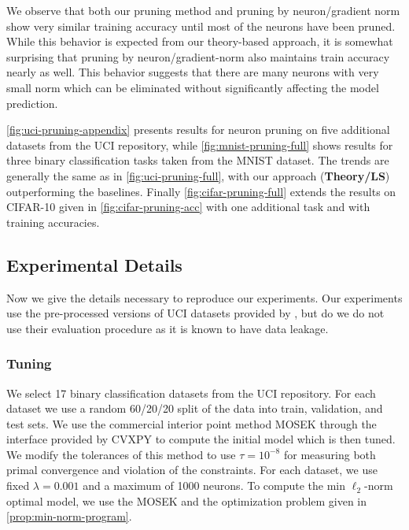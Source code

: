 We observe that both our pruning method and pruning by neuron/gradient norm
show very similar training accuracy until most of the neurons have been pruned.
While this behavior is expected from our theory-based approach, it is somewhat
surprising that pruning by neuron/gradient-norm also maintains train accuracy
nearly as well.
This behavior suggests that there are many neurons with very small norm which
can be eliminated without significantly affecting the model prediction.

\cref{fig:uci-pruning-appendix} presents results for neuron pruning on
five additional datasets from the UCI repository, while
\cref{fig:mnist-pruning-full} shows results for three binary classification
tasks taken from the MNIST dataset.
The trends are generally the same as in \cref{fig:uci-pruning-full},
with our approach (\textbf{Theory/LS}) outperforming the baselines.
Finally \cref{fig:cifar-pruning-full} extends the results on CIFAR-10
given in \cref{fig:cifar-pruning-acc} with one additional task
and with training accuracies.

\subsection{Experimental Details}

Now we give the details necessary to reproduce our experiments.
Our experiments use the pre-processed versions of UCI datasets provided by
\citet{delgado2014hundreds}, but do we do not use their evaluation procedure as
it is known to have data leakage.

\subsubsection{Tuning}

We select 17 binary classification datasets from the UCI
repository.
For each dataset we use a random 60/20/20 split of the data
into train, validation, and test sets.
We use the commercial interior point method MOSEK \citep{aps2022mosek}
through the interface provided by CVXPY \citep{diamond2016cvxpy}
to compute the initial model which is then tuned.
We modify the tolerances of this method to use \( \tau = 10^{-8} \) for measuring
both primal convergence and violation of the constraints.
For each dataset, we use fixed \( \lambda = 0.001 \) and a maximum of 1000
neurons.
To compute the min \( \ell_2 \)-norm optimal model,
we use the MOSEK and the optimization problem given in \cref{prop:min-norm-program}.

